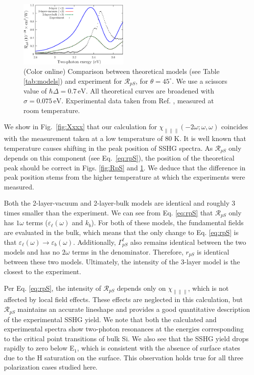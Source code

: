 \documentclass[prb,superscriptaddress,showpacs,twocolumn,letterpaper]{revtex4}
\begin{document}
\begin{figure}[b]
\centering
\includegraphics[width=0.48\textwidth]{plots/fig4}
\caption{(Color online) Comparison between theoretical models (see Table
\ref{tab:models}) and experiment for $\mathcal{R}_{pS}$, for $\theta=45^\circ$.
We use a scissors value of $\hbar\Delta = 0.7\,\text{eV}$. All theoretical
curves are broadened with $\sigma=0.075\,\text{eV}$. Experimental data taken
from Ref. , measured at room temperature.
\label{fig:mitchellRpS}}
\end{figure}


We show in Fig.~\ref{fig:Xxxx} that our calculation for
$\chi_{\parallel\parallel\parallel}(-2\omega;\omega,\omega)$ coincides with the
measurement taken at a low temperature of 80 K. It is well known that
temperature causes shifting in the peak position of SSHG
spectra.\cite{dadapPRB97} As $\mathcal{R}_{pS}$ only depends on this component
(see Eq.~\eqref{eq:rpS}), the position of the theoretical peak should be correct
in Figs. \ref{fig:RpS} and \ref{fig:mitchellRpS}. We deduce that the difference
in peak position stems from the higher  temperature at which the experiments
were measured.


Both the 2-layer-vacuum and 2-layer-bulk models are identical and roughly 3
times smaller than the experiment. We can see from Eq. \eqref{eq:rpS} that
$\mathcal{R}_{pS}$ only has $1\omega$ terms ($\varepsilon_{\ell}(\omega)$ and
$k_{b}$). For both of these models, the fundamental fields are evaluated in the
bulk, which means that the only change to Eq. \eqref{eq:rpS} is that
$\varepsilon_{\ell}(\omega) \rightarrow \varepsilon_{b}(\omega)$. Additionally,
$\Gamma^{\ell}_{pS}$ also remains identical between the two models and has no
$2\omega$ terms in the denominator. Therefore, $r_{pS}$ is identical between
these two models. Ultimately, the intensity of the 3-layer model is the closest
to the experiment.

Per Eq. \eqref{eq:rpS}, the intensity of $\mathcal{R}_{pS}$ depends only on
$\chi_{\parallel\parallel\parallel}$, which is not affected by local field
effects.\cite{tancognedejean:tel-01235611} These effects are neglected in this
calculation, but $\mathcal{R}_{pS}$ maintains an accurate lineshape and provides
a good quantitative description of the experimental SSHG yield. We note that
both the calculated and experimental spectra show two-photon resonances at the
energies corresponding to the critical point transitions of bulk Si. We also see
that the SSHG yield drops rapidly to zero below E$_{1}$, which is consistent
with the absence of surface states due to the H saturation on the surface. This
observation holds true for all three polarization cases studied here.
\end{document}
